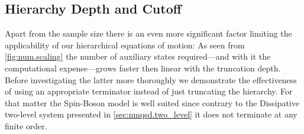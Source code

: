 \subsection{Hierarchy Depth and Cutoff}
\label{sub:num.spin_boson.depth}
%

Apart from the sample size there is an even more significant factor limiting the applicability of our hierarchical equations of motion:
As seen from \autoref{fig:num.scaling} the number of auxiliary states required---and with it the computational expense---grows faster then linear with the truncation depth.
Before investigating the latter more thoroughly we demonstrate the effectiveness of using an appropriate terminator instead of just truncating the hierarchy.
For that matter the Spin-Boson model is well suited since contrary to the Dissipative two-level system presented in \autoref{sec:nmqsd.two_level} it does not terminate at any finite order.
